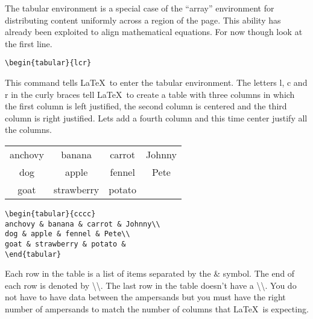 \vspace*{2ex}

The tabular environment is a special case of the ``array'' environment for distributing content uniformly across a region of the page.  This ability has already been exploited to align mathematical equations. For now though look at the first line.

\vspace*{2ex}

\begin{verbatim}
\begin{tabular}{lcr}
\end{verbatim}

\vspace*{2ex}

This command tells \LaTeX\ to enter the tabular environment. The letters l, c and r in the curly braces tell \LaTeX\ to create a table with three columns in which the first column is left justified, the second column is centered and the third column is right justified. Lets add a fourth column and this time center justify all the columns.

\begin{center}
\begin{tabular}{cccc}
anchovy & banana & carrot & Johnny\\
dog & apple & fennel & Pete\\
goat & strawberry & potato &
\end{tabular}

\vspace*{2ex}

\begin{verbatim}
\begin{tabular}{cccc}
anchovy & banana & carrot & Johnny\\
dog & apple & fennel & Pete\\
goat & strawberry & potato &
\end{tabular}
\end{verbatim}
\end{center}

\vspace*{2ex}

Each row in the table is a list of items separated by the {\&} symbol. The end of each row is denoted by \textbackslash\textbackslash. The last row in the table doesn't have a \textbackslash\textbackslash. You do not have to have data between the ampersands but you must have the right number of ampersands to match the number of columns that \LaTeX\ is expecting.


